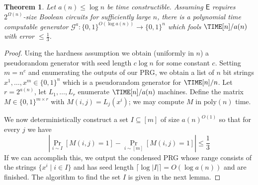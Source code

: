 \documentclass[11pt]{article}
\newtheorem{theorem}{Theorem}
\newcommand{\B}{\{0,1\}}
\renewcommand{\poly}{\mathrm{poly}}
\begin{document}
\begin{theorem}\label{thm:deterministic}
Let $a(n) \leq \log n$ be time constructible. Assuming $\mathsf{E}$ requires $2^{\Omega(n)}$-size Boolean circuits for sufficiently large $n$, there is a polynomial time computable generator $\mathcal{G}^a: \B^{O(\log a(n))} \to \B^n$ which fools $\TIME[n]/a(n)$ with error $\leq \frac{1}{3}$.
\end{theorem}
\begin{proof}
Using the hardness assumption we obtain (uniformly in $n$) a pseudorandom generator with seed length $c \log n$ for some constant $c$. Setting $m = n^c$ and enumerating the outputs of our PRG, we obtain a list of $n$ bit strings $x^1,\ldots,x^m \in \B^n$ which is a pseudorandom generator for $\TIME[n]/n$. Let $r = 2^{a(n)}$, let $L_1,\ldots,L_{r}$ enumerate $\TIME[n]/a(n)$ machines. Define the matrix $M \in \B^{m \times r}$ with $M(i,j) = L_j(x^i)$; we may compute $M$ in $\poly(n)$ time.

We now deterministically construct a set $I \subseteq [m]$ of size $a(n)^{O(1)}$ so that for every $j$ we have
\[
|\Pr_{i \sim I}[M(i,j) = 1] - \Pr_{i \sim [m]}[M(i,j) = 1]| \leq \frac{1}{3}
\]
If we can accomplish this, we output the condensed PRG whose range consists of the strings $\{x^i \mid i \in I\}$ and has seed length $\lceil \log |I| \rceil = O(\log a(n))$ and are finished. The algorithm to find the set $I$ is given in the next lemma.
\end{proof}
\end{document}
